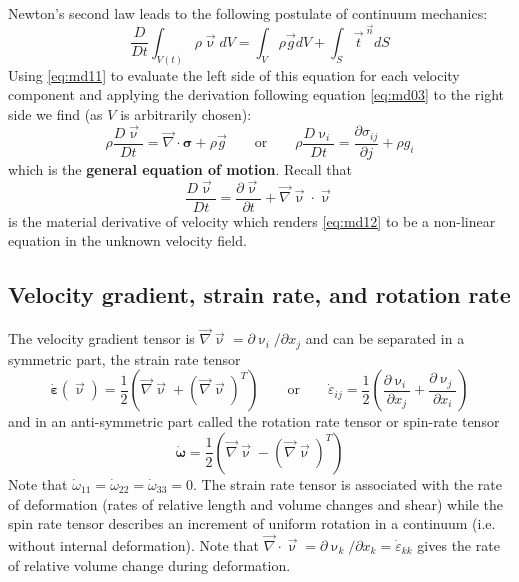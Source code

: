 Newton’s second law leads to the following postulate of continuum mechanics:
\[
\frac{D}{Dt} \int_{V(t)} \rho \vec\upnu dV
=
\int_{V} \rho \vec{g} dV + \int_S \vec{t}^{\; \vec{n}} dS
\]
Using \eqref{eq:md11} to evaluate the left side of this equation 
for each velocity component and
applying the derivation following equation 
\eqref{eq:md03}
to the 
right side we find (as $V$ is arbitrarily chosen):
\begin{equation}
\rho \frac{D\vec\upnu}{Dt} = \vec\nabla\cdot {\bm \sigma} + \rho \vec{g}
\qquad
\text{or}
\qquad
\rho\frac{D \upnu_i}{Dt} = \frac{\partial \sigma_{ij}}{\partial j} + \rho {g}_i
\label{eq:md12}
\end{equation}
which is the {\bf general equation of motion}.
Recall that
\[
\frac{D\vec\upnu}{Dt} = \frac{\partial \vec\upnu}{\partial t}
+
\vec\nabla \vec\upnu \cdot \vec\upnu
\]
is the material derivative of velocity which renders \eqref{eq:md12} to
be a non-linear equation in the unknown velocity field.

\subsection{Velocity gradient, strain rate, and rotation rate}
The velocity gradient tensor is $\vec\nabla\vec\upnu = \partial \upnu_i/\partial x_j$
and can be separated in a symmetric part, the strain rate tensor 
\[
\dot{\bm \varepsilon}(\vec\upnu) = \frac12 \left(  
\vec\nabla\vec\upnu + (\vec\nabla\vec\upnu)^T 
\right)
\qquad
\text{or}
\qquad
\dot\varepsilon_{ij}=\frac12 \left(
\frac{\partial \upnu_i}{\partial x_j}
+ \frac{\partial \upnu_j}{\partial x_i}
\right)
\]
and in an anti-symmetric part called the rotation
rate tensor or spin-rate tensor
\[
\dot{\bm\omega}=  \frac12 \left(  
\vec\nabla\vec\upnu - (\vec\nabla\vec\upnu)^T \right) 
\]
Note that $\dot\omega_{11}=\dot\omega_{22}=\dot\omega_{33}=0$.
The strain rate tensor is associated with the rate of
deformation (rates of relative length and volume changes and shear) 
while the spin rate
tensor describes an increment of uniform rotation in a continuum 
(i.e. without internal deformation). 
Note that  $\vec\nabla\cdot\vec\upnu= \partial \upnu_k/\partial x_k = 
\dot\varepsilon_{kk}$ gives the rate of relative volume change
during deformation.


\vspace{0.5cm}
\vspace{0.5cm}


